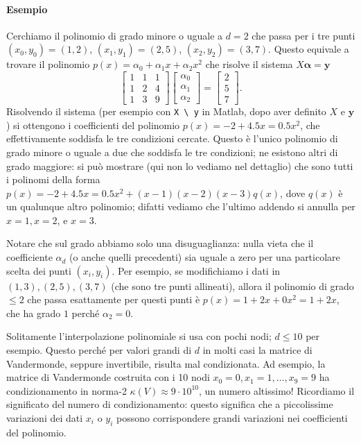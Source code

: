 \documentclass[a4paper]{report}
\theoremstyle{definiton}
\theoremstyle{remark}
\begin{document}
\paragraph{Esempio} Cerchiamo il polinomio di grado minore o uguale a $d=2$ che passa per i tre punti $(x_0,y_0) = (1,2)$, $(x_1,y_1) = (2,5)$, $(x_2,y_2) = (3,7)$. Questo equivale a trovare il polinomio $p(x) = \alpha_0 + \alpha_1 x + \alpha_2 x^2$ che risolve il sistema $X\mathbf{\alpha} = \mathbf{y}$
\[
    \begin{bmatrix}
    1 & 1 & 1\\
    1 & 2 & 4\\
    1 & 3 & 9
    \end{bmatrix}\begin{bmatrix}
        \alpha_0\\
        \alpha_1\\
        \alpha_2
    \end{bmatrix} = \begin{bmatrix}
        2\\5\\7
    \end{bmatrix}.
\]
Risolvendo il sistema (per esempio con \lstinline{X \ y} in Matlab, dopo aver definito $X$ e $\mathbf{y}$) si ottengono i coefficienti del polinomio $p(x) = -2 + 4.5 x = 0.5x^2$, che effettivamente soddisfa le tre condizioni cercate. Questo è l'unico polinomio di grado minore o uguale a due che soddisfa le tre condizioni; ne esistono altri di grado maggiore: si può mostrare (qui non lo vediamo nel dettaglio) che sono tutti i polinomi della forma $p(x) = -2 + 4.5 x = 0.5x^2 + (x-1)(x-2)(x-3)q(x)$, dove $q(x)$ è un qualunque altro polinomio; difatti vediamo che l'ultimo addendo si annulla per $x=1,x=2$, e $x=3$. 

Notare che sul grado abbiamo solo una disuguaglianza: nulla vieta che il coefficiente $\alpha_d$ (o anche quelli precedenti) sia uguale a zero per una particolare scelta dei punti $(x_i,y_i)$. Per esempio, se modifichiamo i dati in $(1,3), (2,5), (3,7)$ (che sono tre punti allineati), allora il polinomio di grado $\leq 2$ che passa esattamente per questi punti è $p(x)=1+2x+0x^2 = 1+2x$, che ha grado $1$ perché $\alpha_2 = 0$. 

Solitamente l'interpolazione polinomiale si usa con pochi nodi; $d \leq 10$ per esempio. Questo perché per valori grandi di $d$ in molti casi la matrice di Vandermonde, seppure invertibile, risulta mal condizionata. Ad esempio, la matrice di Vandermonde costruita con i 10 nodi $x_0 = 0,x_1=1,\dots,x_9=9$ ha condizionamento in norma-2 $\kappa(V) \approx 9\cdot 10^{10}$, un numero altissimo! Ricordiamo il significato del numero di condizionamento: questo significa che a piccolissime variazioni dei dati $x_i$ o $y_i$ possono corrispondere grandi variazioni nei coefficienti del polinomio. 
\end{document}
